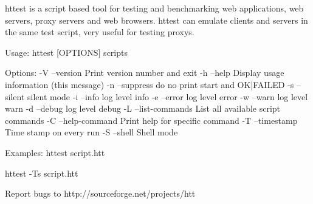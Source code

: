 \begin{usplisting}

    httest is a script based tool for testing and benchmarking web 
    applications, web servers, proxy servers and web browsers. httest 
    can emulate clients and servers in the same test script, very 
    useful for testing proxys.

    Usage: httest [OPTIONS] scripts

    Options:
      -V --version         Print version number and exit
      -h --help            Display usage information (this message)
      -n --suppress        do no print start and OK|FAILED
      -s --silent          silent mode
      -i --info            log level info
      -e --error           log level error
      -w --warn            log level warn
      -d --debug           log level debug
      -L --list-commands   List all available script commands
      -C --help-command    Print help for specific command
      -T --timestamp       Time stamp on every run
      -S --shell           Shell mode
   
    Examples:
    httest script.htt
   
    httest -Ts script.htt
   
    Report bugs to http://sourceforge.net/projects/htt   
\end{usplisting}

